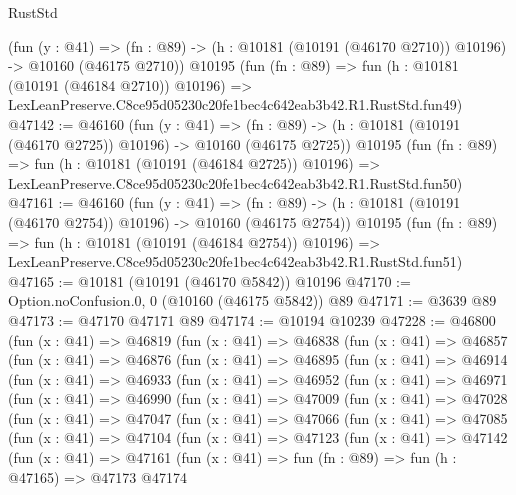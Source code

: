 \begin{lexlean}{RustStd}
\begin{coremodule}
    (fun (y : @41) =>
    (fn : @89) -> (h : @10181 (@10191 (@46170 @2710)) @10196) -> @10160 (@46175 @2710))
    @10195
    (fun (fn : @89) =>
    fun (h : @10181 (@10191 (@46184 @2710)) @10196) =>
    LexLeanPreserve.C8ce95d05230c20fe1bec4c642eab3b42.R1.RustStd.fun49)
@47142 := @46160
    (fun (y : @41) =>
    (fn : @89) -> (h : @10181 (@10191 (@46170 @2725)) @10196) -> @10160 (@46175 @2725))
    @10195
    (fun (fn : @89) =>
    fun (h : @10181 (@10191 (@46184 @2725)) @10196) =>
    LexLeanPreserve.C8ce95d05230c20fe1bec4c642eab3b42.R1.RustStd.fun50)
@47161 := @46160
    (fun (y : @41) =>
    (fn : @89) -> (h : @10181 (@10191 (@46170 @2754)) @10196) -> @10160 (@46175 @2754))
    @10195
    (fun (fn : @89) =>
    fun (h : @10181 (@10191 (@46184 @2754)) @10196) =>
    LexLeanPreserve.C8ce95d05230c20fe1bec4c642eab3b42.R1.RustStd.fun51)
@47165 := @10181 (@10191 (@46170 @5842)) @10196
@47170 := Option.noConfusion.{0, 0} (@10160 (@46175 @5842)) @89
@47171 := @3639 @89
@47173 := @47170 @47171 @89
@47174 := @10194 @10239
@47228 := @46800
    (fun (x : @41) =>
    @46819
      (fun (x : @41) =>
      @46838
        (fun (x : @41) =>
        @46857
          (fun (x : @41) =>
          @46876
            (fun (x : @41) =>
            @46895
              (fun (x : @41) =>
              @46914
                (fun (x : @41) =>
                @46933
                  (fun (x : @41) =>
                  @46952
                    (fun (x : @41) =>
                    @46971
                      (fun (x : @41) =>
                      @46990
                        (fun (x : @41) =>
                        @47009
                          (fun (x : @41) =>
                          @47028
                            (fun (x : @41) =>
                            @47047
                              (fun (x : @41) =>
                              @47066
                                (fun (x : @41) =>
                                @47085
                                  (fun (x : @41) =>
                                  @47104
                                    (fun (x : @41) =>
                                    @47123
                                      (fun (x : @41) =>
                                      @47142
                                        (fun (x : @41) =>
                                        @47161
                                          (fun (x : @41) =>
                                          fun (fn : @89) =>
                                          fun (h : @47165) =>
                                          @47173
                                            @47174

\end{coremodule}
\end{lexlean}
